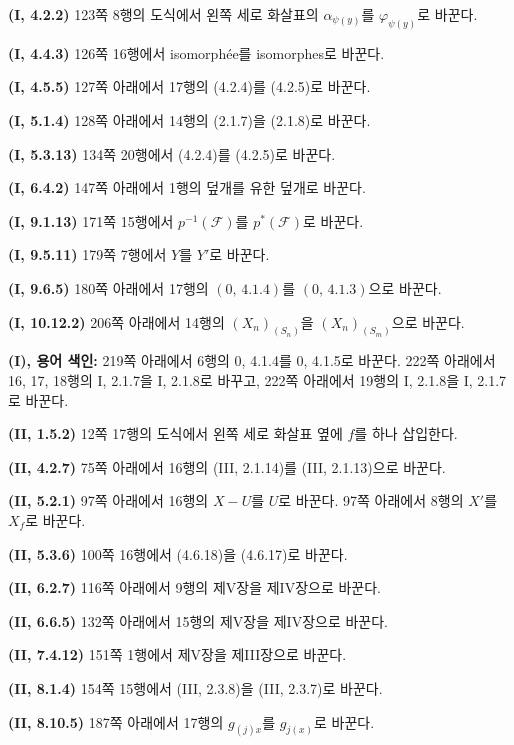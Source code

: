\noindent\textbf{(I, 4.2.2)} 123쪽 8행의 도식에서 왼쪽 세로 화살표의
$\alpha_{\psi(y)}$를 $\varphi_{\psi(y)}$로 바꾼다.

\noindent\textbf{(I, 4.4.3)} 126쪽 16행에서 isomorphée를
isomorphes로 바꾼다.

\noindent\textbf{(I, 4.5.5)} 127쪽 아래에서 17행의 (4.2.4)를
(4.2.5)로 바꾼다.

\noindent\textbf{(I, 5.1.4)} 128쪽 아래에서 14행의 (2.1.7)을
(2.1.8)로 바꾼다.

\noindent\textbf{(I, 5.3.13)} 134쪽 20행에서 (4.2.4)를 (4.2.5)로
바꾼다.

\noindent\textbf{(I, 6.4.2)} 147쪽 아래에서 1행의 덮개를 유한 덮개로
바꾼다.

\noindent\textbf{(I, 9.1.13)} 171쪽 15행에서
$p^{-1}(\mathscr F)$를 $p^*(\mathscr F)$로 바꾼다.

\noindent\textbf{(I, 9.5.11)} 179쪽 7행에서 $Y$를 $Y'$로 바꾼다.

\noindent\textbf{(I, 9.6.5)} 180쪽 아래에서 17행의
$(0,\,4.1.4)$를 $(0,\,4.1.3)$으로 바꾼다.

\noindent\textbf{(I, 10.12.2)} 206쪽 아래에서 14행의
$(X_n)_{(S_n)}$을 $(X_n)_{(S_m)}$으로 바꾼다.

\clearpage
{}
\noindent\textbf{(I), 용어 색인:} 219쪽 아래에서 6행의 0, 4.1.4를
0, 4.1.5로 바꾼다. 222쪽 아래에서 16, 17, 18행의 I, 2.1.7을
I, 2.1.8로 바꾸고, 222쪽 아래에서 19행의 I, 2.1.8을 I, 2.1.7로
바꾼다.

\noindent\textbf{(II, 1.5.2)} 12쪽 17행의 도식에서 왼쪽 세로 화살표
옆에 $f$를 하나 삽입한다.

\noindent\textbf{(II, 4.2.7)} 75쪽 아래에서 16행의 (III, 2.1.14)를
(III, 2.1.13)으로 바꾼다.

\noindent\textbf{(II, 5.2.1)} 97쪽 아래에서 16행의 $X-U$를 $U$로
바꾼다. 97쪽 아래에서 8행의 $X'$를 $X_f$로 바꾼다.

\noindent\textbf{(II, 5.3.6)} 100쪽 16행에서 (4.6.18)을 (4.6.17)로
바꾼다.

\noindent\textbf{(II, 6.2.7)} 116쪽 아래에서 9행의 제V장을 제IV장으로
바꾼다.

\noindent\textbf{(II, 6.6.5)} 132쪽 아래에서 15행의 제V장을
제IV장으로 바꾼다.

\noindent\textbf{(II, 7.4.12)} 151쪽 1행에서 제V장을 제III장으로
바꾼다.

\noindent\textbf{(II, 8.1.4)} 154쪽 15행에서 (III, 2.3.8)을
(III, 2.3.7)로 바꾼다.

\noindent\textbf{(II, 8.10.5)} 187쪽 아래에서 17행의
$g_{(j)x}$를 $g_{j(x)}$로 바꾼다.



